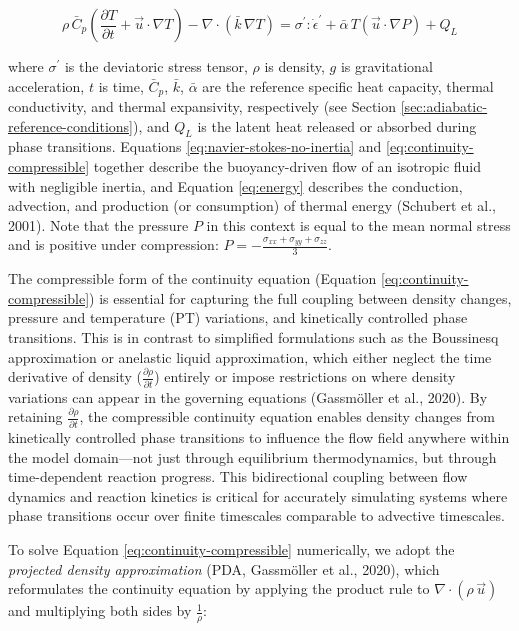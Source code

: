 \documentclass[draft,linenumbers]{agujournal2019}
\begin{document}
\begin{equation}
  \rho\, \bar{C}_p \left(\frac{\partial T}{\partial t} + \vec{u} \cdot \nabla T \right) - \nabla \cdot \left(\bar{k}\, \nabla T \right) = \sigma^{\prime} : \dot{\epsilon}^{\prime} + \bar{\alpha}\, T \left(\vec{u} \cdot \nabla P \right) + Q_L
  \label{eq:energy}
\end{equation}

where \(\sigma^{\prime}\) is the deviatoric stress tensor, \(\rho\) is
density, \(g\) is gravitational acceleration, \(t\) is time,
\(\bar{C}_p\), \(\bar{k}\), \(\bar{\alpha}\) are the reference specific
heat capacity, thermal conductivity, and thermal expansivity,
respectively (see Section \ref{sec:adiabatic-reference-conditions}), and
\(Q_L\) is the latent heat released or absorbed during phase
transitions. Equations \ref{eq:navier-stokes-no-inertia} and
\ref{eq:continuity-compressible} together describe the buoyancy-driven
flow of an isotropic fluid with negligible inertia, and Equation
\ref{eq:energy} describes the conduction, advection, and production (or
consumption) of thermal energy (Schubert et al., 2001). Note that the
pressure \(P\) in this context is equal to the mean normal stress and is
positive under compression:
\(P = - \frac{\sigma_{xx} + \sigma_{yy} + \sigma_{zz}}{3}\).

The compressible form of the continuity equation (Equation
\ref{eq:continuity-compressible}) is essential for capturing the full
coupling between density changes, pressure and temperature (PT)
variations, and kinetically controlled phase transitions. This is in
contrast to simplified formulations such as the Boussinesq approximation
or anelastic liquid approximation, which either neglect the time
derivative of density (\(\frac{\partial \rho}{\partial t}\)) entirely or
impose restrictions on where density variations can appear in the
governing equations (Gassmöller et al., 2020). By retaining
\(\frac{\partial \rho}{\partial t}\), the compressible continuity
equation enables density changes from kinetically controlled phase
transitions to influence the flow field anywhere within the model
domain---not just through equilibrium thermodynamics, but through
time-dependent reaction progress. This bidirectional coupling between
flow dynamics and reaction kinetics is critical for accurately
simulating systems where phase transitions occur over finite timescales
comparable to advective timescales.

To solve Equation \ref{eq:continuity-compressible} numerically, we adopt
the \emph{projected density approximation} (PDA, Gassmöller et al.,
2020), which reformulates the continuity equation by applying the
product rule to \(\nabla \cdot (\rho\, \vec{u})\) and multiplying both
sides by \(\frac{1}{\rho}\):
\end{document}
